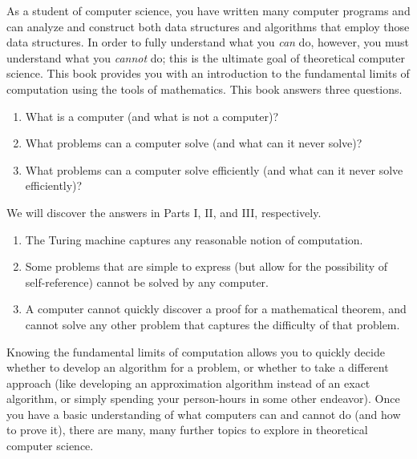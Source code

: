 As a student of computer science, you have written many computer programs and can analyze and construct both data structures and algorithms that employ those data structures.
In order to fully understand what you \emph{can} do, however, you must understand what you \emph{cannot} do; this is the ultimate goal of theoretical computer science.
This book provides you with an introduction to the fundamental limits of computation using the tools of mathematics.
This book answers three questions.
\begin{enumerate}
\item What is a computer (and what is not a computer)?
\item What problems can a computer solve (and what can it never solve)?
\item What problems can a computer solve efficiently (and what can it never solve efficiently)?
\end{enumerate}

We will discover the answers in Parts I, II, and III, respectively.
\begin{enumerate}
\item The Turing machine captures any reasonable notion of computation.
\item Some problems that are simple to express (but allow for the possibility of self-reference) cannot be solved by any computer.
\item A computer cannot quickly discover a proof for a mathematical theorem, and cannot solve any other problem that captures the difficulty of that problem.
\end{enumerate}
Knowing the fundamental limits of computation allows you to quickly decide whether to develop an algorithm for a problem, or whether to take a different approach (like developing an approximation algorithm instead of an exact algorithm, or simply spending your person-hours in some other endeavor).
Once you have a basic understanding of what computers can and cannot do (and how to prove it), there are many, many further topics to explore in theoretical computer science.
